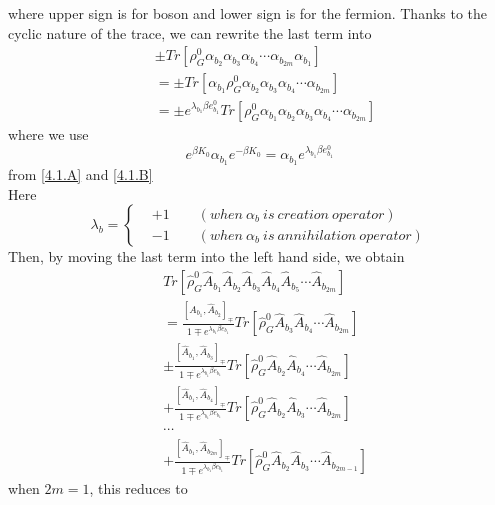 where upper sign is for boson and lower sign is for the fermion.
Thanks to the cyclic nature of the trace, we can rewrite the last term into
\begin{equation}
\begin{aligned}
&\pm Tr[\rho_G^0\alpha_{b_2}\alpha_{b_3}\alpha_{b_4}\cdots\alpha_{b_{2m}}\alpha_{b_1}]\\
&=\pm Tr[\alpha_{b_1}\rho_G^0\alpha_{b_2}\alpha_{b_3}\alpha_{b_4}\cdots\alpha_{b_{2m}}]\\
&=\pm e^{\lambda_{b_1}\beta e_{b_1}^0}Tr[\rho_G^0\alpha_{b_1}\alpha_{b_2}\alpha_{b_3}\alpha_{b_4}\cdots\alpha_{b_{2m}}]
\end{aligned}
\end{equation}
where we use
\begin{equation}
e^{\beta K_0}\alpha_{b_1}e^{-\beta K_0}=\alpha_{b_1}e^{\lambda_{b_1}\beta e_{b_1}^0}
\end{equation}
from \ref{4.1.A} and \ref{4.1.B}\\
Here\\
$$
\lambda_b=\left\{
\begin{aligned}
&+1\qquad(when\ \alpha_b\ is\ creation\ operator)\\
&-1\qquad(when\ \alpha_b\ is\ annihilation\ operator)
\end{aligned}
\right.
$$
Then, by moving the last term into the left hand side, we obtain
\begin{equation}\label{4.3.D}
\begin{aligned}
&Tr[\hat{\rho}_G^0\hat A_{b_1} \hat A_{b_2} \hat A_{b_3} \hat A_{b_4} \hat A_{b_5} \cdots \hat A_{b_{2m}}]\\
&=\frac{[\hat A_{b_1},\hat A_{b_2}]_\mp}{1\mp e^{\lambda_{b_1}\beta e_{b_1}}} Tr[\hat{\rho}_G^0 \hat A_{b_3}\hat A_{b_4}\cdots \hat A_{b_{2m}}]\\
&\pm\frac{[\hat A_{b_1},\hat A_{b_3}]_\mp}{1\mp e^{\lambda_{b_1}\beta e_{b_1}}} Tr[\hat{\rho}_G^0 \hat A_{b_2}\hat A_{b_4}\cdots \hat A_{b_{2m}}]\\
&+\frac{[\hat A_{b_1},\hat A_{b_4}]_\mp}{1\mp e^{\lambda_{b_1}\beta e_{b_1}}} Tr[\hat{\rho}_G^0 \hat A_{b_2}\hat A_{b_3}\cdots \hat A_{b_{2m}}]\\
&\cdots\\
&+\frac{[\hat A_{b_1},\hat A_{b_{2m}}]_\mp}{1\mp e^{\lambda_{b_1}\beta e_{b_1}}} Tr[\hat{\rho}_G^0 \hat A_{b_2}\hat A_{b_3}\cdots \hat A_{b_{2m-1}}]
\end{aligned}
\end{equation}
when $2m=1$, this reduces to
